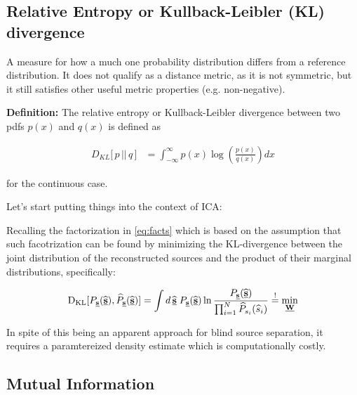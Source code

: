 \subsection{Relative Entropy or Kullback-Leibler (KL) divergence}

A measure for how a much one probability distribution differs from a reference distribution. 
It does not qualify as a distance metric, as it is not symmetric, but it still satisfies other useful metric properties (e.g. non-negative).

\textbf{Definition:} 
The relative entropy or Kullback-Leibler divergence between two pdfs $p(x)$ and $q(x)$ is defined as



\begin{align}
\label{eq:klcont}
D_{KL}\lbrack\,p\, ||\, q\,\rbrack 
&= \int_{-\infty}^{\infty} p(x) \log \left( \frac{p(x)}{q(x)} \right) dx
\end{align}

for the continuous case.

\clearpage 
Let's start putting things into the context of ICA:

Recalling the factorization in \eqref{eq:facts} which is based on the assumption that such facotrization can be found by minimizing 
the KL-divergence between the joint distribution of the reconstructed sources and the product of their marginal distributions, specifically:

\begin{equation}
\label{eq:klmin}
	\mathrm{D}_{\mathrm{KL}}[P_{\underline{\mathbf{s}}}(\widehat{\underline{\mathbf{s}}}),\widehat{P}_{\underline{\mathbf{s}}}(\widehat{\underline{\mathbf{s}}})] = 
    \int d \, \widehat{\underline{\mathbf{s}}} \; P_{\underline{\mathbf{s}}}(\widehat{\underline{\mathbf{s}}})
		\ln \frac{P_{\underline{\mathbf{s}}}(\widehat{\underline{\mathbf{s}}})}{
			\prod_{i = 1}^N \widehat{P}_{s_i}(\widehat{s}_i) }
		\stackrel{\mathrm{!}}{=} \min_{\underline{\mathbf{W}}}
\end{equation}

In spite of this being an apparent approach for blind source separation, it requires a paramtereized density estimate which is computationally costly.

\subsection{Mutual Information}

